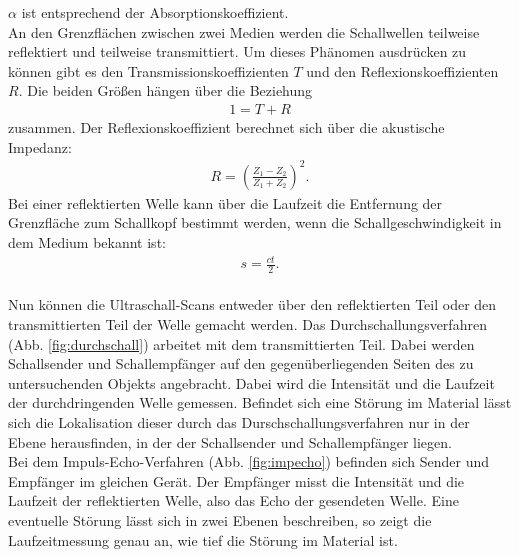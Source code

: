 $\alpha$ ist entsprechend der Absorptionskoeffizient.
\\An den Grenzflächen zwischen zwei Medien werden die Schallwellen teilweise reflektiert und teilweise transmittiert.
Um dieses Phänomen ausdrücken zu können gibt es den Transmissionskoeffizienten $T$ und den Reflexionskoeffizienten $R$.
Die beiden Größen hängen über die Beziehung
\begin{align*}
  1=T+R
\end{align*}
zusammen.
Der Reflexionskoeffizient berechnet sich über die akustische Impedanz:
\begin{align*}
  R= \left( \frac{Z_{\text{1}}-Z_{\text{2}}}{Z_{\text{1}}+Z_{\text{2}}} \right)^2.
\end{align*}
Bei einer reflektierten Welle kann über die Laufzeit die Entfernung der Grenzfläche zum Schallkopf bestimmt werden, wenn die Schallgeschwindigkeit in dem Medium bekannt ist:
\begin{align*}
  s=\frac{c t}{2}.
\end{align*}
\\Nun können die Ultraschall-Scans entweder über den reflektierten Teil oder den transmittierten Teil der Welle gemacht werden.
Das Durchschallungsverfahren (Abb. \ref{fig:durchschall}) arbeitet mit dem transmittierten Teil.
Dabei werden Schallsender und Schallempfänger auf den gegenüberliegenden Seiten des zu untersuchenden Objekts angebracht.
Dabei wird die Intensität und die Laufzeit der durchdringenden Welle gemessen.
Befindet sich eine Störung im Material lässt sich die Lokalisation dieser durch das Durschschallungsverfahren nur in der Ebene herausfinden, in der der Schallsender und Schallempfänger liegen.
\\Bei dem Impuls-Echo-Verfahren (Abb. \ref{fig:impecho}) befinden sich Sender und Empfänger im gleichen Gerät.
Der Empfänger misst die Intensität und die Laufzeit der reflektierten Welle, also das Echo der gesendeten Welle.
Eine eventuelle Störung lässt sich in zwei Ebenen beschreiben, so zeigt die Laufzeitmessung genau an, wie tief die Störung im Material ist.

